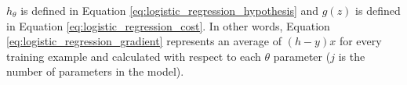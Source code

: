 $h_{\theta}$ is defined in Equation \ref{eq:logistic_regression_hypothesis} and $g(z)$ is defined in Equation \ref{eq:logistic_regression_cost}.  In other words, Equation \ref{eq:logistic_regression_gradient} represents an average of $(h-y)x$ for every training example and calculated with respect to each $\theta$ parameter ($j$ is the number of parameters in the model).

%
%
%
%
%
%
%
%
